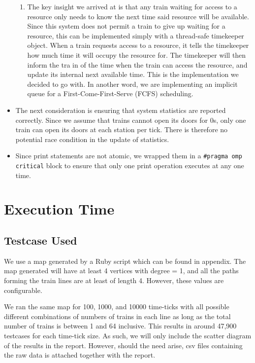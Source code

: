 \documentclass[a4paper,12pt]{article}
\begin{document}
\begin{itemize}
\begin{enumerate}
			\item The key insight we arrived at is that any train waiting for access to a resource only needs to know the next time said resource will be available. Since this system does not permit a train to give up waiting for a resource, this can be implemented simply with a thread-safe timekeeper object. When a train requests access to a resource, it tells the timekeeper how much time it will occupy the resource for. The timekeeper will then inform the tra in of the time when the train can access the resource, and update its internal next available time. This is the implementation we decided to go with. In another word, we are implementing an implicit queue for a First-Come-First-Serve (FCFS) scheduling.
		\end{enumerate}
		\item The next consideration is ensuring that system statistics are reported correctly. Since we assume that trains cannot open its doors for 0s, only one train can open its doors at each station per tick. There is therefore no potential race condition in the update of statistics.
		\item Since print statements are not atomic, we wrapped them in a \texttt{#pragma omp critical} block to ensure that only one print operation executes at any one time.
	\end{itemize}
	
	\section{Execution Time}
	
	\subsection{Testcase Used}
	We use a map generated by a Ruby script which can be found in appendix. The map generated will have at least 4 vertices with degree = 1, and all the paths forming the train lines are at least of length 4. However, these values are configurable.
	
	We ran the same map for 100, 1000, and 10000 time-ticks with all possible different combinations of numbers of trains in each line as long as the total number of trains is between 1 and 64 inclusive. This results in around 47,900 testcases for each time-tick size. As such, we will only include the scatter diagram of the results in the report. However, should the need arise, csv files containing the raw data is attached together with the report.
	
\end{document}
